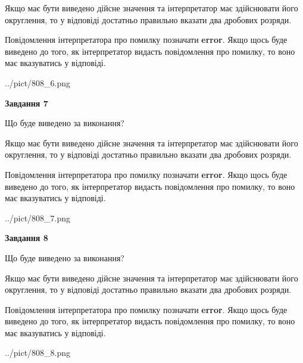 \documentclass[12pt, ukrainian]{article}
\begin{document}
{\begin {Large}
Якщо має бути виведено дійсне значення та інтерпретатор має здійснювати його округлення, 
то у відповіді достатньо правильно вказати два дробових розряди.

Повідомлення інтерпретатора про помилку позначати \textbf{error}.
Якщо щось буде виведено до того, як інтерпретатор видасть повідомлення про помилку, 
то воно має вказуватись у відповіді. \par

\begin{center}
	{../pict/808_6.png}
\end{center}
\newpage

{\begin {center}\textbf{Завдання 7}\end {center}}\par
Що буде виведено за виконання? \par

Якщо має бути виведено дійсне значення та інтерпретатор має здійснювати його округлення, 
то у відповіді достатньо правильно вказати два дробових розряди.

Повідомлення інтерпретатора про помилку позначати \textbf{error}.
Якщо щось буде виведено до того, як інтерпретатор видасть повідомлення про помилку, 
то воно має вказуватись у відповіді. \par

\begin{center}
	{../pict/808_7.png}
\end{center}
\newpage

{\begin {center}\textbf{Завдання 8}\end {center}}\par
Що буде виведено за виконання? \par

Якщо має бути виведено дійсне значення та інтерпретатор має здійснювати його округлення, 
то у відповіді достатньо правильно вказати два дробових розряди.

Повідомлення інтерпретатора про помилку позначати \textbf{error}.
Якщо щось буде виведено до того, як інтерпретатор видасть повідомлення про помилку, 
то воно має вказуватись у відповіді. \par

\begin{center}
	{../pict/808_8.png}
\end{center}
\newpage


\end{Large}}
\end{document}
